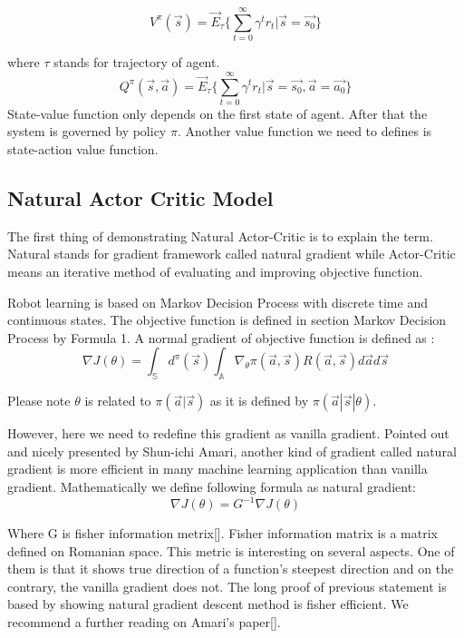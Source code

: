 \documentclass[officiallayout]{tktla}
\begin{document}
\begin{equation}
V^\pi(\vec{s}) = \vec{E}_\tau\{\sum_{t=0}^\infty\gamma^tr_t|\vec{s} = \vec{s_0}\}
\end{equation}

where $\tau$ stands for trajectory of agent.
\begin{equation}
Q^\pi(\vec{s}, \vec{a}) = \vec{E}_\tau\{\sum_{t=0}^\infty\gamma^tr_t|\vec{s} = \vec{s_0}, \vec{a} = \vec{a_0}\}
\end{equation}
State-value function only depends on the first state of agent. After that the system
is governed by policy $\pi$. Another value function we need to defines is state-action
value function.
\subsection{Natural Actor Critic Model}
The first thing of demonstrating Natural Actor-Critic is to explain the term. Natural
stands for gradient framework called natural gradient while Actor-Critic means an
iterative method of evaluating and improving objective function.

Robot learning is based on Markov Decision Process with discrete time and continuous
states. The objective function is defined in section Markov Decision Process
by Formula 1. A normal gradient of objective function is defined as :
\begin{equation}
\nabla J(\theta) = \int_\mathbb{S} d^\pi(\vec{s})\int_\mathbb{A}\nabla_\theta \pi(\vec{a}, \vec{s})R(\vec{a}, \vec{s})d\vec{a}d\vec{s}
\label{objective_function}
\end{equation}


Please note $\theta$ is related to $\pi(\vec{a}|\vec{s})$ as it is defined by $\pi(\vec{a}|\vec{s}|\theta)$.

However, here we need to redefine this gradient as vanilla gradient. Pointed out
and nicely presented by Shun-ichi Amari, another kind of gradient called natural
gradient is more efficient in many machine learning application than vanilla gradient.
Mathematically we define following formula as natural gradient:
\begin{equation}
\nabla J(\theta) = G^{-1}\nabla J(\theta)
\end{equation}

Where G is fisher information metrix[].
Fisher information matrix is a matrix defined on Romanian space. This metric
is interesting on several aspects. One of them is that it shows true direction of
a function's steepest direction and on the contrary, the vanilla gradient does not.
The long proof of previous statement is based by showing natural gradient descent
method is fisher efficient. We recommend a further reading on Amari's paper[].
\end{document}
